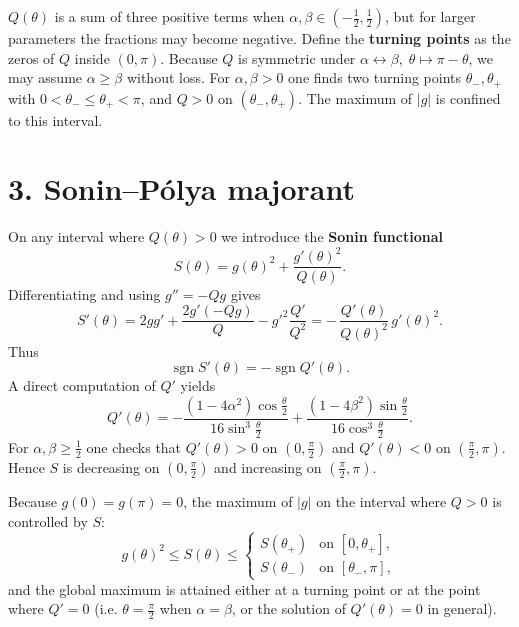 \documentclass[11pt]{article}
\begin{document}
\(Q(\theta)\) is a sum of three positive terms when \(\alpha,\beta\in(-\tfrac12,\tfrac12)\), but for larger parameters the fractions may become negative.
Define the \textbf{turning points} as the zeros of \(Q\) inside \((0,\pi)\).  Because \(Q\) is symmetric under \(\alpha\leftrightarrow\beta,\;\theta\mapsto\pi-\theta\), we may assume \(\alpha\ge\beta\) without loss.
For \(\alpha,\beta>0\) one finds two turning points \(\theta_-,\theta_+\) with \(0<\theta_-\le\theta_+<\pi\), and \(Q>0\) on \((\theta_-,\theta_+)\).  The maximum of \(|g|\) is confined to this interval.



\section*{3. Sonin–Pólya majorant}

On any interval where \(Q(\theta)>0\) we introduce the \textbf{Sonin functional}
\begin{equation*}
\boxed{S(\theta)=g(\theta)^2+\frac{g'(\theta)^2}{Q(\theta)}.}
\end{equation*}
Differentiating and using \(g''=-Qg\) gives
\begin{equation*}
S'(\theta)=2gg'+\frac{2g'(-Qg)}{Q}-g'^2\frac{Q'}{Q^2}
= -\,\frac{Q'(\theta)}{Q(\theta)^2}\,g'(\theta)^2.
\end{equation*}
Thus
\begin{equation*}
\operatorname{sgn} S'(\theta)= -\operatorname{sgn} Q'(\theta).
\end{equation*}
A direct computation of \(Q'\) yields
\begin{equation*}
Q'(\theta)= -\frac{(1-4\alpha^2)\cos\frac{\theta}{2}}{16\sin^3\frac{\theta}{2}}
            +\frac{(1-4\beta^2)\sin\frac{\theta}{2}}{16\cos^3\frac{\theta}{2}}.
\end{equation*}
For \(\alpha,\beta\ge\tfrac12\) one checks that \(Q'(\theta)>0\) on \((0,\frac{\pi}{2})\) and \(Q'(\theta)<0\) on \((\frac{\pi}{2},\pi)\).  Hence \(S\) is decreasing on \((0,\frac{\pi}{2})\) and increasing on \((\frac{\pi}{2},\pi)\).

Because \(g(0)=g(\pi)=0\), the maximum of \(|g|\) on the interval where \(Q>0\) is controlled by \(S\):
\begin{equation*}
g(\theta)^2\le S(\theta)\le
\begin{cases}
S(\theta_+) & \text{on }[0,\theta_+],\\
S(\theta_-) & \text{on }[\theta_-,\pi],
\end{cases}
\end{equation*}
and the global maximum is attained either at a turning point or at the point where \(Q'=0\) (i.e. \(\theta=\frac{\pi}{2}\) when \(\alpha=\beta\), or the solution of \(Q'(\theta)=0\) in general).
\end{document}
